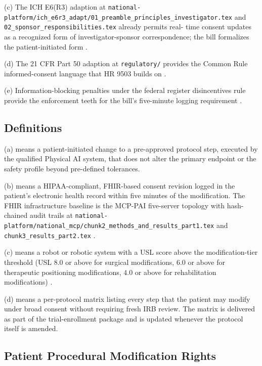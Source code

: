 (c) The ICH E6(R3) adaption at
\texttt{national-platform/ich\_e6r3\_adapt/01\_preamble\_principles\_investigator.tex}
and \texttt{02\_sponsor\_responsibilities.tex} already permits real-
time consent updates as a recognized form of investigator-sponsor
correspondence; the bill formalizes the patient-initiated form
\cite{kawchak_2026_18973368}.

(d) The 21 CFR Part 50 adaption at
\texttt{regulatory/} provides the Common Rule informed-consent
language that HR 9503 builds on \cite{kawchak_2026_19040707}.

(e) Information-blocking penalties under the federal register
disincentives rule provide the enforcement teeth for the bill's
five-minute logging requirement
\cite{federal_register_info_blocking_disincentives_2024}.

\subsection{Definitions}

(a)  means a patient-initiated
change to a pre-approved protocol step, executed by the qualified
Physical AI system, that does not alter the primary endpoint or the
safety profile beyond pre-defined tolerances.

(b)  means a HIPAA-compliant,
FHIR-based consent revision logged in the patient's electronic health
record within five minutes of the modification. The FHIR
infrastructure baseline is the MCP-PAI five-server topology with hash-
chained audit trails at
\texttt{national-platform/national\_mcp/chunk2\_methods\_and\_results\_part1.tex}
and \texttt{chunk3\_results\_part2.tex} \cite{kawchak_2026_19244918}.

(c)  means a robot or
robotic system with a USL score above the modification-tier
threshold (USL 8.0 or above for surgical modifications, 6.0 or above
for therapeutic positioning modifications, 4.0 or above for
rehabilitation modifications) \cite{kawchak_2026_18778219}.

(d)  means a per-protocol matrix
listing every step that the patient may modify under broad consent
without requiring fresh IRB review. The matrix is delivered as part
of the trial-enrollment package and is updated whenever the protocol
itself is amended.

\subsection{Patient Procedural Modification Rights}

